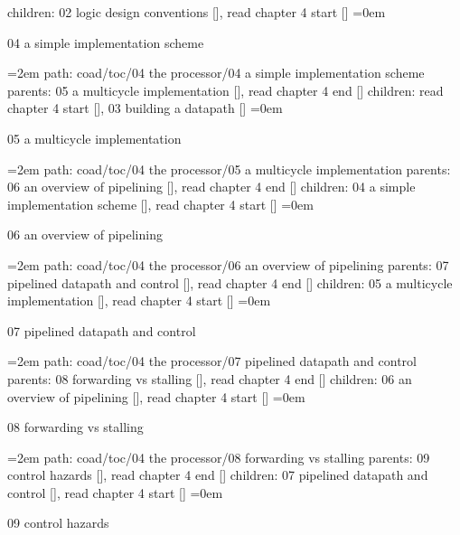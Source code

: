 children: 02 logic design conventions [], read chapter 4 start []
\smallskip
\leftskip=0em
\par\endgroup
\bigskip
{}
04 a simple implementation scheme
\smallskip
\par\begingroup
\leftskip=2em
path: coad/toc/04 the processor/04 a simple implementation scheme
\smallskip
parents:  05 a multicycle implementation [], read chapter 4 end []
\smallskip
children: read chapter 4 start [], 03 building a datapath []
\smallskip
\leftskip=0em
\par\endgroup
\bigskip
{}
05 a multicycle implementation
\smallskip
\par\begingroup
\leftskip=2em
path: coad/toc/04 the processor/05 a multicycle implementation
\smallskip
parents:  06 an overview of pipelining [], read chapter 4 end []
\smallskip
children: 04 a simple implementation scheme [], read chapter 4 start []
\smallskip
\leftskip=0em
\par\endgroup
\bigskip
{}
06 an overview of pipelining
\smallskip
\par\begingroup
\leftskip=2em
path: coad/toc/04 the processor/06 an overview of pipelining
\smallskip
parents:  07 pipelined datapath and control [], read chapter 4 end []
\smallskip
children: 05 a multicycle implementation [], read chapter 4 start []
\smallskip
\leftskip=0em
\par\endgroup
\bigskip
{}
07 pipelined datapath and control
\smallskip
\par\begingroup
\leftskip=2em
path: coad/toc/04 the processor/07 pipelined datapath and control
\smallskip
parents:  08 forwarding vs stalling [], read chapter 4 end []
\smallskip
children: 06 an overview of pipelining [], read chapter 4 start []
\smallskip
\leftskip=0em
\par\endgroup
\bigskip
{}
08 forwarding vs stalling
\smallskip
\par\begingroup
\leftskip=2em
path: coad/toc/04 the processor/08 forwarding vs stalling
\smallskip
parents:  09 control hazards [], read chapter 4 end []
\smallskip
children: 07 pipelined datapath and control [], read chapter 4 start []
\smallskip
\leftskip=0em
\par\endgroup
\bigskip
{}
09 control hazards
\smallskip
\par\begingroup
